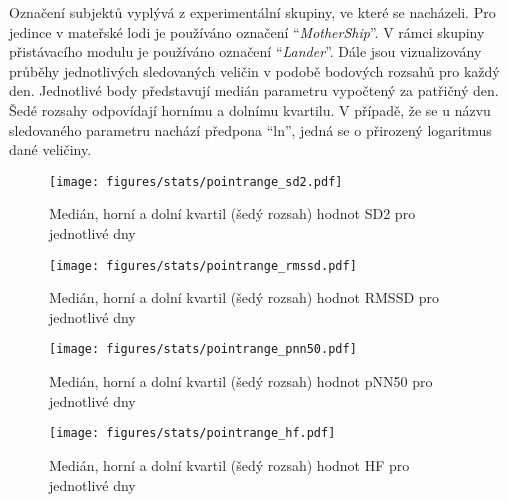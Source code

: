 Označení subjektů vyplývá z experimentální skupiny, ve které se nacházeli. Pro
jedince v mateřské lodi je používáno označení \enquote{\textit{MotherShip}}. V
rámci skupiny přistávacího modulu je používáno označení
\enquote{\textit{Lander}}. Dále jsou vizualizovány průběhy jednotlivých
sledovaných veličin v podobě bodových rozsahů pro každý den. Jednotlivé body
představují medián parametru vypočtený za patřičný den. Šedé rozsahy odpovídají
hornímu a dolnímu kvartilu. V případě, že se u názvu sledovaného parametru
nachází předpona \enquote{ln}, jedná se o přirozený logaritmus dané veličiny.

\begin{figure}[h]
    \begin{center}
        \texttt{[image: figures/stats/pointrange\_sd2.pdf]}
        \caption{Medián, horní a dolní kvartil (šedý rozsah) hodnot SD2 pro jednotlivé dny}
        \label{fig:results_pointrange_rmssd}
    \end{center}
    \vspace{-10mm}
\end{figure}
\begin{figure}[h]
    \begin{center}
        \texttt{[image: figures/stats/pointrange\_rmssd.pdf]}
        \caption{Medián, horní a dolní kvartil (šedý rozsah) hodnot RMSSD pro jednotlivé dny}
        \label{fig:results_pointrange_rmssd}
    \end{center}
    \vspace{-10mm}
\end{figure}
\begin{figure}[h]
    \begin{center}
        \texttt{[image: figures/stats/pointrange\_pnn50.pdf]}
        \caption{Medián, horní a dolní kvartil (šedý rozsah) hodnot pNN50 pro jednotlivé dny}
        \label{fig:results_pointrange_rmssd}
    \end{center}
    \vspace{-20mm}
\end{figure}

\begin{figure}[h]
    \begin{center}
        \texttt{[image: figures/stats/pointrange\_hf.pdf]}
        \caption{Medián, horní a dolní kvartil (šedý rozsah) hodnot HF pro jednotlivé dny}
        \label{fig:results_pointrange_rmssd}
    \end{center}
\end{figure}

